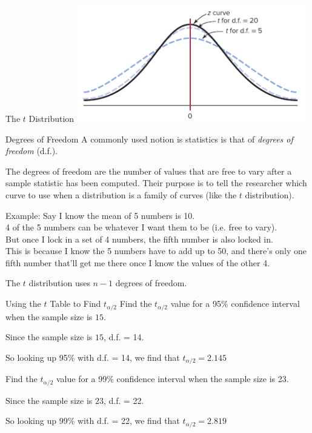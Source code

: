 \documentclass[t, aspectratio=169]{beamer}
\newcommand{\?}{\stackrel{?}{=}}
\begin{document}
	\begin{frame}{The $t$ Distribution}
		\includegraphics[width=0.75\textwidth]{t-graph.png}
	\end{frame}

	\begin{frame}{Degrees of Freedom}
		A commonly used notion is statistics is that of \textit{degrees of freedom} (d.f.). \pause
		
		The degrees of freedom are the number of values that are free to vary after a sample statistic has been computed. \pause Their purpose is to tell the researcher which curve to use when a distribution is a family of curves (like the $t$ distribution). \pause
		
		Example: Say I know the mean of 5 numbers is 10. \pause \\
		4 of the 5 numbers can be whatever I want them to be (i.e. free to vary). \pause \\
		But once I lock in a set of 4 numbers, the fifth number is also locked in. \pause \\
		This is because I know the 5 numbers have to add up to 50, and there's only one fifth number that'll get me there once I know the values of the other 4. \pause
		
		The $t$ distribution uses $n - 1$ degrees of freedom.
	\end{frame}

	\begin{frame}{Using the $t$ Table to Find $t_{\alpha/2}$}
		Find the $t_{\alpha/2}$ value for a 95\% confidence interval when the sample size is $15$. \pause
		
		Since the sample size is $15$, d.f. = 14. \pause
		
		So looking up 95\% with d.f. = 14, we find that $t_{\alpha/2} = 2.145$ \vspace{1in} \pause
		
		Find the $t_{\alpha/2}$ value for a 99\% confidence interval when the sample size is 23. \pause
		
		Since the sample size is $23$, d.f. = 22. \pause
		
		So looking up 99\% with d.f. = 22, we find that $t_{\alpha/2} = 2.819$
	\end{frame}
\end{document}
